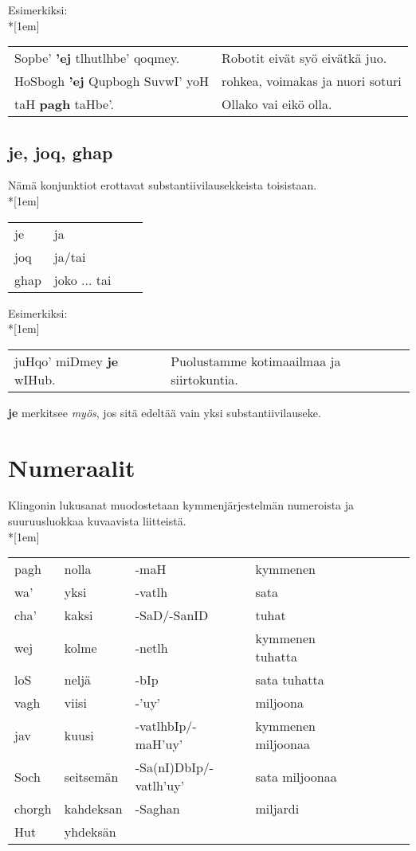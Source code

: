 \documentclass{book}
\begin{document}
Esimerkiksi:\\*[1em]
\begin{tabular}{l l}
    Sopbe' \textbf{'ej} tlhutlhbe' qoqmey. & Robotit eivät syö eivätkä juo. \\
    HoSbogh \textbf{'ej} Qupbogh SuvwI' yoH & rohkea, voimakas ja nuori soturi \\
    taH \textbf{pagh} taHbe'. & Ollako vai eikö olla. \\
\end{tabular}

\section{je, joq, ghap}

Nämä konjunktiot erottavat substantiivilausekkeista toisistaan.\\*[1em]
\begin{tabular}{Bl Il}
    je & ja \\
    joq & ja/tai \\
    ghap & joko ... tai \\
\end{tabular}

Esimerkiksi:\\*[1em]
\begin{tabular}{l l}
    juHqo' miDmey \textbf{je} wIHub. & Puolustamme kotimaailmaa ja siirtokuntia. \\
\end{tabular}

\textbf{je} merkitsee \textit{myös}, jos sitä edeltää vain yksi substantiivilauseke.

\chapter{Numeraalit}

Klingonin lukusanat muodostetaan kymmenjärjestelmän numeroista ja suuruusluokkaa kuvaavista liitteistä.
\\*[1em]
\begin{tabular}{Bl Il | Bl Il}
    pagh & nolla & -maH & kymmenen \\
    wa' & yksi & -vatlh & sata \\
    cha' & kaksi & -SaD/-SanID & tuhat \\
    wej & kolme & -netlh & kymmenen tuhatta \\
    loS & neljä & -bIp & sata tuhatta \\
    vagh & viisi & -'uy' & miljoona \\
    jav & kuusi & -vatlhbIp/-maH'uy' & kymmenen miljoonaa \\
    Soch & seitsemän & -Sa(nI)DbIp/-vatlh'uy' & sata miljoonaa \\
    chorgh & kahdeksan & -Saghan & miljardi \\
    Hut & yhdeksän & & \\
\end{tabular}
\end{document}
